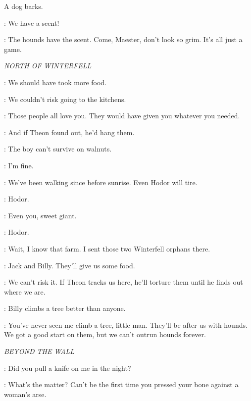 \sfx A dog barks.

\DAGMER: We have a scent!

\THEON: The hounds have the scent. Come, Maester, don't look so grim. It's all just a game.


\scene

\textit{NORTH OF WINTERFELL}


\OSHA: We should have took more food.

\BRAN: We couldn't risk going to the kitchens.

\OSHA: Those people all love you. They would have given you whatever you needed.

\BRAN: And if Theon found out, he'd hang them.

\OSHA: The boy can't survive on walnuts.

\RICKON: I'm fine.

\OSHA: We've been walking since before sunrise. Even Hodor will tire.

\HODOR: Hodor.

\OSHA: Even you, sweet giant.

\HODOR:  Hodor.


\BRAN: Wait, I know that farm. I sent those two Winterfell orphans there.

\RICKON: Jack and Billy. They'll give us some food.

\BRAN: We can't risk it. If Theon tracks us here, he'll torture them until he finds out where we are.

\RICKON: Billy climbs a tree better than anyone.

\OSHA: You've never seen me climb a tree, little man. They'll be after us with hounds. We got a good start on them, but we can't outrun hounds forever.



\scene

\textit{BEYOND THE WALL}


\YGRITTE: Did you pull a knife on me in the night?


\YGRITTE: What's the matter? Can't be the first time you pressed your bone against a woman's arse.

